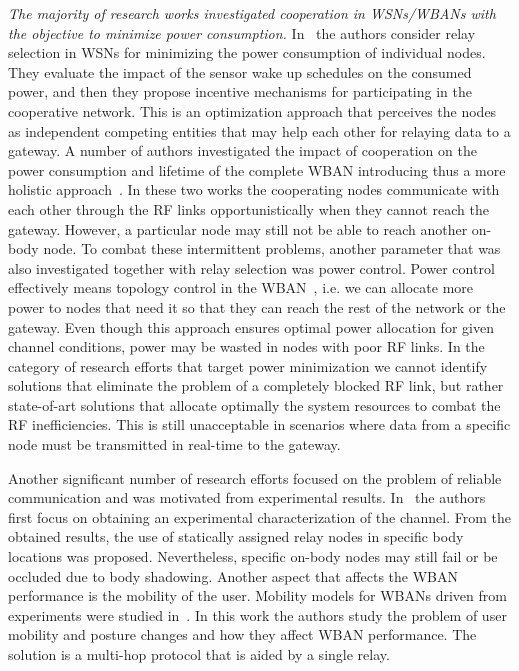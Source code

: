 \documentclass[10pt]{IEEEtran}
\begin{document}
\textit{The majority of research works investigated cooperation in WSNs/WBANs with the objective to minimize power consumption.} In~\cite{naveen11} the authors consider relay selection in WSNs for minimizing the power consumption of individual nodes. They evaluate the impact of the sensor wake up schedules on the consumed power, and then they propose incentive mechanisms for participating in the cooperative network. This is an optimization approach that perceives the nodes as independent competing entities that may help each other for relaying data to a gateway. A number of authors investigated the impact of cooperation on the power consumption and lifetime of the complete WBAN introducing thus a more holistic approach~\cite{ehyaie09,engel13}. In these two works the cooperating nodes communicate with each other through the RF links opportunistically when they cannot reach the gateway. However, a particular node may still not be able to reach another on-body node. To combat these intermittent problems, another parameter that was also investigated together with relay selection was power control. Power control effectively means topology control in the WBAN~\cite{elias12}, i.e. we can allocate more power to nodes that need it so that they can reach the rest of the network or the gateway. Even though this approach ensures optimal power allocation for given channel conditions, power may be wasted in nodes with poor RF links. In the category of research efforts that target power minimization we cannot identify solutions that eliminate the problem of a completely blocked RF link, but rather state-of-art solutions that allocate optimally the system resources to combat the RF inefficiencies. This is still unacceptable in scenarios where data from a specific node must be transmitted in real-time to the gateway.


Another significant number of research efforts focused on the problem of reliable communication and was motivated from experimental results. In~\cite{braem07} the authors first focus on obtaining an experimental characterization of the channel. From the obtained results, the use of statically assigned relay nodes in specific body locations was proposed. Nevertheless, specific on-body nodes may still fail or be occluded due to body shadowing. Another aspect that affects the WBAN performance is the mobility of the user. Mobility models for WBANs driven from experiments were studied in~\cite{nabi11b}. In this work the authors study the problem of user mobility and posture changes and how they affect WBAN performance. The solution is a multi-hop protocol that is aided by a single relay.
\end{document}
